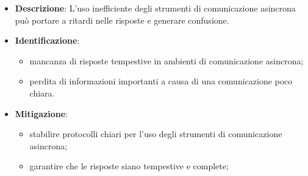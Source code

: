 \label{risk:comunicazione asincrona inefficace}
\begin{itemize}
	\item \textbf{Descrizione}:
			L'uso inefficiente degli strumenti di comunicazione asincrona 
			può portare a ritardi nelle risposte e generare confusione.

	\item \textbf{Identificazione}:
	      \begin{itemize}
		      \item mancanza di risposte tempestive in ambienti di comunicazione asincrona;

		      \item perdita di informazioni importanti a causa di una comunicazione poco chiara.
	      \end{itemize}

	\item \textbf{Mitigazione}:
	      \begin{itemize}
		      \item stabilire protocolli chiari per l'uso degli strumenti di comunicazione asincrona;

		      \item garantire che le risposte siano tempestive e complete;
	      \end{itemize}
\end{itemize}
